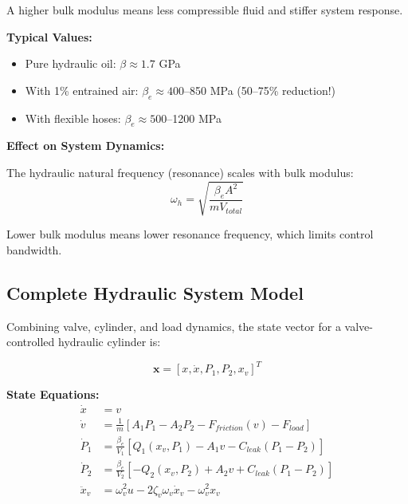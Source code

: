 A higher bulk modulus means less compressible fluid and stiffer system response.

\textbf{Typical Values:}
\begin{itemize}
    \item Pure hydraulic oil: $\beta \approx 1.7$ GPa
    \item With 1\% entrained air: $\beta_e \approx 400$--850 MPa (50--75\% reduction!)
    \item With flexible hoses: $\beta_e \approx 500$--1200 MPa
\end{itemize}


\textbf{Effect on System Dynamics:}

The hydraulic natural frequency (resonance) scales with bulk modulus:
\begin{equation}
    \omega_h = \sqrt{\frac{\beta_e A^2}{m V_{total}}}
\end{equation}

Lower bulk modulus means lower resonance frequency, which limits control bandwidth.

\subsection{Complete Hydraulic System Model}

Combining valve, cylinder, and load dynamics, the state vector for a valve-controlled hydraulic cylinder is:

\begin{equation}
    \mathbf{x} = [x, \dot{x}, P_1, P_2, x_v]^T
\end{equation}

\textbf{State Equations:}
\begin{align}
    \dot{x} &= v \\
    \dot{v} &= \frac{1}{m}[A_1 P_1 - A_2 P_2 - F_{friction}(v) - F_{load}] \\
    \dot{P}_1 &= \frac{\beta_e}{V_1}[Q_1(x_v, P_1) - A_1 v - C_{leak}(P_1 - P_2)] \\
    \dot{P}_2 &= \frac{\beta_e}{V_2}[-Q_2(x_v, P_2) + A_2 v + C_{leak}(P_1 - P_2)] \\
    \ddot{x}_v &= \omega_v^2 u - 2\zeta_v \omega_v \dot{x}_v - \omega_v^2 x_v
\end{align}

